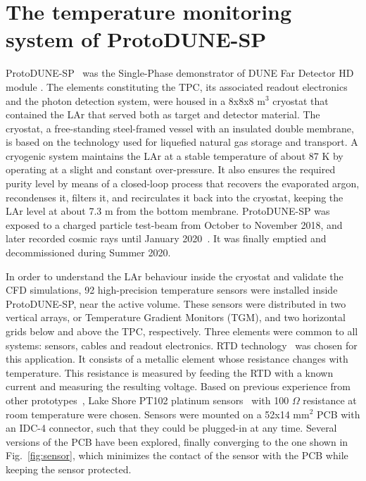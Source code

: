 \section{The temperature monitoring system of ProtoDUNE-SP}
\label{sec:protoDUNE}

\noindent ProtoDUNE-SP~\cite{pdsp_tdr} was the Single-Phase demonstrator of DUNE Far Detector HD module \cite{dune_tdr4}. %
The elements constituting the TPC, its associated readout electronics and the photon detection system, were housed in a 8x8x8 m$^3$ cryostat that contained the LAr that served both as target and detector material. The cryostat, a free-standing steel-framed vessel with an insulated double membrane, is based on the technology used for liquefied natural gas storage and transport. A cryogenic system maintains the LAr at a stable temperature of about 87 K by operating at a slight and constant over-pressure. It also ensures the required purity level by means of a closed-loop process that recovers the evaporated argon, recondenses it, filters it, and recirculates it back into the cryostat, keeping the LAr level at about 7.3 m from the bottom membrane. ProtoDUNE-SP was exposed to a charged particle test-beam from October to November 2018, and later recorded cosmic rays until January 2020~\cite{pdsp_1,pdsp_2}. It was finally emptied and decommissioned during Summer 2020.

In order to understand the LAr behaviour inside the cryostat and validate the CFD simulations, 92 high-precision temperature sensors were installed inside ProtoDUNE-SP, near the active volume. These sensors were distributed in two vertical arrays, or Temperature Gradient Monitors (TGM), and two horizontal grids below and above the TPC, respectively. Three elements were common to all systems: sensors, cables and readout electronics. RTD technology~\cite{minco} was chosen for this application. It consists of a metallic element whose resistance changes with temperature. This resistance is measured by feeding the RTD with a known current and measuring the resulting voltage. Based on previous experience from other prototypes~\cite{35t_1}, Lake Shore PT102 platinum sensors~\cite{pt102} with 100 $\Omega$ resistance at room temperature were chosen. Sensors were mounted on a 52x14 mm$^2$ PCB with an IDC-4 connector, such that they could be plugged-in at any time. Several versions of the PCB have been explored, finally converging to the one shown in Fig.~\ref{fig:sensor}, which minimizes the contact of the sensor with the PCB while keeping the sensor protected.

